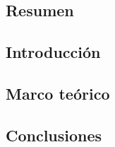\documentclass[12pt,letterpaper]{article}
\begin{document}

\subsection*{Resumen}

\subsection*{Introducción}

\subsection*{Marco teórico}

\subsection*{Conclusiones}


\nocite{*}

\end{document}
